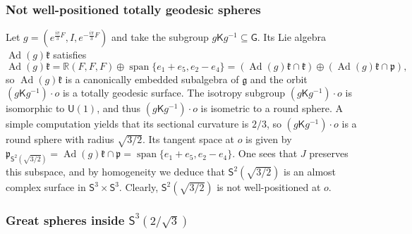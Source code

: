 \documentclass[11pt,a4paper,final]{amsart}
\newcommand{\g}{\mathfrak}
\newcommand{\R}{\mathbb{R}}
\newcommand{\Ad}{\operatorname{Ad}}
\newcommand{\vecspan}{\operatorname{span}}
\theoremstyle{definition}
\begin{document}
\subsubsection{Not well-positioned totally geodesic spheres \cite[Example~2]{BoltonDillenDioosVrancken}}
	
Let $g=\left(e^{\frac{i\pi}{3}F},I,e^{-\frac{i\pi}{3}F}\right)$ and take the subgroup $g\mathsf{K}g^{-1}\subseteq \mathsf{G}$.
Its Lie algebra $\Ad(g)\g{k}$ satisfies 
\begin{equation*}
	\Ad(g)\g{k}=\R (F,F,F)\oplus \vecspan \{ e_{1}+e_{5},e_{2}-e_{4} \}=\left(\Ad(g)\g{k} \cap \g{k}\right)\oplus \left( \Ad(g)\g{k}\cap \g{p} \right),
\end{equation*}
so $\Ad(g)\g{k}$ is a canonically embedded subalgebra of $\g{g}$ and the orbit $(g\mathsf{K}g^{-1})\cdot o$ is a totally geodesic surface.
The isotropy subgroup $(g\mathsf{K}g^{-1})\cdot o$ is isomorphic to $\mathsf{U}(1)$, and thus $(g\mathsf{K}g^{-1})\cdot o$ is isometric to a round sphere.
A simple computation yields that its sectional curvature is $2/3$, so $(g\mathsf{K}g^{-1})\cdot o$ is a round sphere with radius $\sqrt{3/2}$.
Its tangent space at $o$ is given by $\g{p}_{\mathsf{S}^{2}( \sqrt{3/2} )}=\Ad(g)\g{k}\cap \g{p}=\vecspan\{e_{1}+e_{5},e_{2}-e_{4}\}$.
One sees that $J$ preserves this subspace, and by homogeneity we deduce that $\mathsf{S}^{2}( \sqrt{3/2})$ is an almost complex surface in $\mathsf{S}^{3}\times\mathsf{S}^{3}$.
Clearly, $\mathsf{S}^{2}( \sqrt{3/2} )$ is not well-positioned at $o$.
	
\subsubsection{Great spheres inside $\mathsf{S}^{3}\left(2/\sqrt{3}\right)$}
\label{sec:S3S3RoundS2}
	
\end{document}

